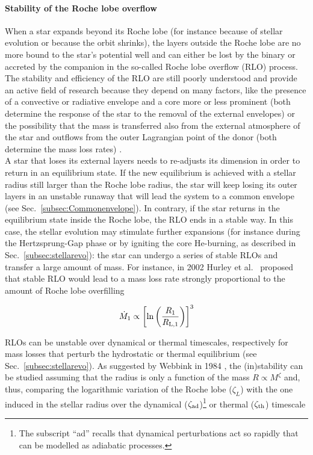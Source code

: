 \documentclass[a4paper,titlepage]{book}     	%
\newcommand{\mdot}{\ensuremath{\dot{M}}}
\newcommand{\rlone}{\ensuremath{R_\textup{L,1}}}
\begin{document}
\paragraph{Stability of the Roche lobe overflow} When a star expands beyond its Roche lobe (for instance because of stellar evolution or because the orbit shrinks), the layers outside the Roche lobe are no more bound to the star's potential well and can either be lost by the binary or accreted by the companion in the so-called Roche lobe overflow (RLO) process. The stability and efficiency of the RLO are still poorly understood and provide an active field of research because they depend on many factors, like the presence of a convective or radiative envelope and a core more or less prominent (both determine the response of the star to the removal of the external envelopes) or the possibility that the mass is transferred also from the external atmosphere of the star and outflows from the outer Lagrangian point of the donor (both determine the mass loss rates) \cite{marchant2021_masstransferMESA}.\\

A star that loses its external layers needs to re-adjusts its dimension in order to return in an equilibrium state. If the new equilibrium is achieved with a stellar radius still larger than the Roche lobe radius, the star will keep losing its outer layers in an unstable runaway that will lead the system to a common envelope (see Sec.\ \ref{subsec:Commonenvelope}). In contrary, if the star returns in the equilibrium state inside the Roche lobe, the RLO ends in a stable way. In this case, the stellar evolution may stimulate further expansions (for instance during the Hertzsprung-Gap phase or by igniting the core He-burning, as described in Sec.\ \ref{subsec:stellarevo}): the star can undergo a series of stable RLOs and transfer a large amount of mass. For instance, in 2002 Hurley et al.\ \cite{Hurley2002} proposed that stable RLO would lead to a mass loss rate strongly proportional to the amount of Roche lobe overfilling 

\begin{equation}\label{eq:masslostRoche}
    \mdot_1 \propto \left[ \ln \left(\frac{R_1}{\rlone} \right)\right]^3
\end{equation}

RLOs can be unstable over dynamical or thermal timescales, respectively for mass losses that perturb the hydrostatic or thermal equilibrium (see Sec.\ \ref{subsec:stellarevo}). As suggested by Webbink in 1984 \cite{Webbink1984_CE}, the (in)stability can be studied assuming that the radius is only a function of the mass $R\propto M^{\zeta}$ and, thus, comparing the logarithmic variation of the Roche lobe ($\zeta_L$) with the one induced in the stellar radius over the dynamical ($\zeta_\textup{ad}$)\footnote{The subscript ``ad'' recalls that dynamical perturbations act so rapidly that can be modelled as adiabatic processes.} or thermal ($\zeta_\textup{th}$) timescale
\end{document}
